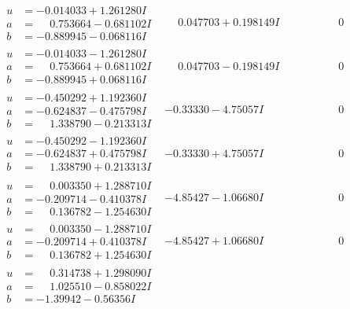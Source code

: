 \documentclass[1p]{elsarticle_modified}
\theoremstyle{definition}
\begin{document}
$$\begin{array}{c|c|c}
\begin{aligned}
u &= -0.014033 + 1.261280 I \\
a &= \phantom{-}0.753664 - 0.681102 I \\
b &= -0.889945 - 0.068116 I\end{aligned}
 & \phantom{-}0.047703 + 0.198149 I & \phantom{-0.000000 } 0 \\ \hline\begin{aligned}
u &= -0.014033 - 1.261280 I \\
a &= \phantom{-}0.753664 + 0.681102 I \\
b &= -0.889945 + 0.068116 I\end{aligned}
 & \phantom{-}0.047703 - 0.198149 I & \phantom{-0.000000 } 0 \\ \hline\begin{aligned}
u &= -0.450292 + 1.192360 I \\
a &= -0.624837 - 0.475798 I \\
b &= \phantom{-}1.338790 - 0.213313 I\end{aligned}
 & -0.33330 - 4.75057 I & \phantom{-0.000000 } 0 \\ \hline\begin{aligned}
u &= -0.450292 - 1.192360 I \\
a &= -0.624837 + 0.475798 I \\
b &= \phantom{-}1.338790 + 0.213313 I\end{aligned}
 & -0.33330 + 4.75057 I & \phantom{-0.000000 } 0 \\ \hline\begin{aligned}
u &= \phantom{-}0.003350 + 1.288710 I \\
a &= -0.209714 - 0.410378 I \\
b &= \phantom{-}0.136782 - 1.254630 I\end{aligned}
 & -4.85427 - 1.06680 I & \phantom{-0.000000 } 0 \\ \hline\begin{aligned}
u &= \phantom{-}0.003350 - 1.288710 I \\
a &= -0.209714 + 0.410378 I \\
b &= \phantom{-}0.136782 + 1.254630 I\end{aligned}
 & -4.85427 + 1.06680 I & \phantom{-0.000000 } 0 \\ \hline\begin{aligned}
u &= \phantom{-}0.314738 + 1.298090 I \\
a &= \phantom{-}1.025510 - 0.858022 I \\
b &= -1.39942 - 0.56356 I\end{aligned}

\end{array}$$
\end{document}
